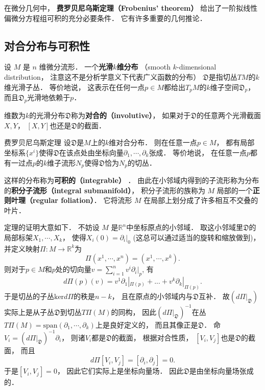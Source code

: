 

在微分几何中， \textbf{费罗贝尼乌斯定理（Frobenius' theorem）} 给出了一阶拟线性偏微分方程组可积的充分必要条件． 它有许多重要的几何推论．

\subsection{对合分布与可积性}
设 $M$ 是 $n$ 维微分流形． 一个\textbf{光滑$k$维分布} （smooth $k$-dimensional distribution， 注意这不是分析学意义下代表广义函数的分布） $\mathfrak{D}$是指切丛$TM$的$k$维光滑子丛． 等价地说， 这表示在任何一点$p\in M$都给出$T_pM$的$k$维子空间$\mathfrak{D}_p$， 而且$\mathfrak{D}_p$光滑地依赖于$p$．

维数为$k$的光滑分布$\mathfrak{D}$称为\textbf{对合的（involutive）}， 如果对于$\mathfrak{D}$的任意两个光滑截面$X,Y$， $[X,Y]$也还是$\mathfrak{D}$的截面． 

\begin{theorem}{费罗贝尼乌斯定理}
设$\mathfrak{D}$是$M$上的$k$维对合分布． 则在任意一点$p\in M$， 都有局部坐标系$\{x^i\}$使得$\mathfrak{D}$在该点处由坐标向量$\partial_1,\cdots ,\partial_k$张成． 等价地说， 在任意一点$p$都有一过点$p$的$k$维子流形$N_p$使得$\mathfrak{D}$恰为$N_p$的切丛．
\end{theorem}
这样的分布称为\textbf{可积的（integrable）} ． 由此在小邻域内得到的子流形称为分布的\textbf{积分子流形（integral submanifold）}， 积分子流形的族称为 $M$ 局部的一个\textbf{正则叶理（regular foliation）}． 它将流形 $M$ 在局部上划分成了许多相互不交叠的叶片．

定理的证明大意如下． 不妨设 $M$ 是$\mathbb{R}^n$中坐标原点的小邻域． 取这小邻域里$\mathfrak{D}$的局部标架$X_1,\cdots ,X_k$， 使得$X_i(0)=\partial_i|_0$ (这总可以通过适当的旋转和缩放做到)， 并定义映射$\Pi: M\to \mathbb{R}^k$为
$$
\Pi(x^1,\cdots ,x^n)=(x^1,\cdots ,x^k).
$$
则对于$p\in M$和$p$处的切向量$v=\sum_{i=1}^nv^i\partial_i|_p$, 有
$$
d\Pi(p)(v)=v^1\partial_1|_{\Pi(p)}+...+v^k\partial_k|_{\Pi(p)}.
$$
于是切丛的子丛$\text{ker}d\Pi$的秩是$n-k$， 且在原点的小邻域内与$\mathfrak{D}$互补． 故$(d\Pi|_{\mathfrak{D}})$实际上是从子丛$\mathfrak{D}$到切丛$T\Pi(M)$的同构， 因此$(d\Pi|_{\mathfrak{D}})^{-1}$在丛$T\Pi(M)=\text{span}(\partial_1,\cdots ,\partial_k)$上是良好定义的， 而且其像正是$\mathfrak{D}$． 命$V_i=(d\Pi|_{\mathfrak{D}})^{-1}\partial_i$， 则诸$V_i$都是$\mathfrak{D}$的截面， 根据对合性质， $[V_i,V_j]$也是$\mathfrak{D}$的截面， 而且
$$
d\Pi[V_i,V_j]=[\partial_i,\partial_j]=0.
$$
于是$[V_i,V_j]=0$， 因此它们实际上是坐标向量场． 因此$\mathfrak{D}$是由坐标向量场张成的．

